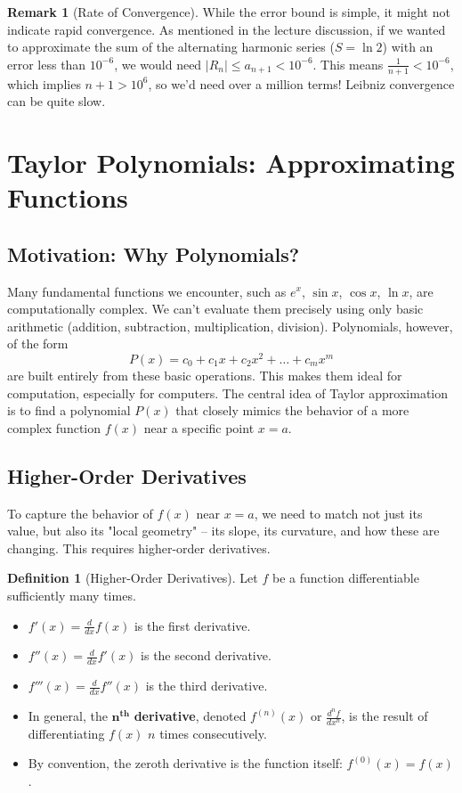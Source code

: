\documentclass[11pt, a4paper]{article}
\theoremstyle{plain} %
\theoremstyle{definition} %
\newtheorem{definition}[theorem]{Definition}
\newtheorem{remark}[theorem]{Remark}
\begin{document}
\begin{remark}[Rate of Convergence]
While the error bound is simple, it might not indicate rapid convergence. As mentioned in the lecture discussion, if we wanted to approximate the sum of the alternating harmonic series ($S = \ln 2$) with an error less than $10^{-6}$, we would need $|R_n| \le a_{n+1} < 10^{-6}$. This means $\frac{1}{n+1} < 10^{-6}$, which implies $n+1 > 10^6$, so we'd need over a million terms! Leibniz convergence can be quite slow.
\end{remark}

\section{Taylor Polynomials: Approximating Functions}

\subsection{Motivation: Why Polynomials?}
Many fundamental functions we encounter, such as $e^x$, $\sin x$, $\cos x$, $\ln x$, are computationally complex. We can't evaluate them precisely using only basic arithmetic (addition, subtraction, multiplication, division). Polynomials, however, of the form
$$ P(x) = c_0 + c_1 x + c_2 x^2 + \dots + c_m x^m $$
are built entirely from these basic operations. This makes them ideal for computation, especially for computers. The central idea of Taylor approximation is to find a polynomial $P(x)$ that closely mimics the behavior of a more complex function $f(x)$ near a specific point $x=a$.

\subsection{Higher-Order Derivatives}
To capture the behavior of $f(x)$ near $x=a$, we need to match not just its value, but also its "local geometry" – its slope, its curvature, and how these are changing. This requires higher-order derivatives.

\begin{definition}[Higher-Order Derivatives]\label{def:higher_deriv}
Let $f$ be a function differentiable sufficiently many times.
\begin{itemize}
    \item $f'(x) = \frac{d}{dx}f(x)$ is the first derivative.
    \item $f''(x) = \frac{d}{dx}f'(x)$ is the second derivative.
    \item $f'''(x) = \frac{d}{dx}f''(x)$ is the third derivative.
    \item In general, the $\boldsymbol{n^{th}}$ \textbf{derivative}, denoted $f^{(n)}(x)$ or $\frac{d^n f}{dx^n}$, is the result of differentiating $f(x)$ $n$ times consecutively.
    \item By convention, the zeroth derivative is the function itself: $f^{(0)}(x) = f(x)$.
\end{itemize}
\end{definition}
\end{document}
